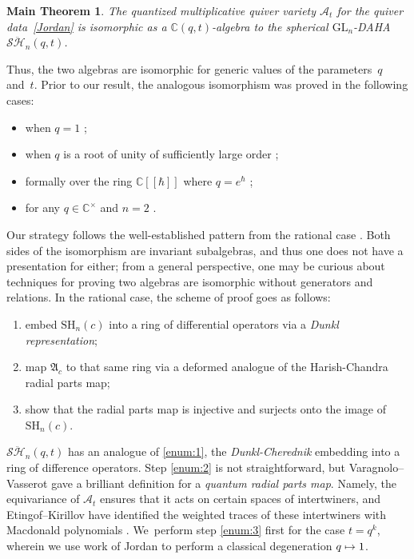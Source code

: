 \documentclass[JEP,XML,SOM,Unicode,published]{cedram}
\newcommand\mto{\mathchoice{\longmapsto}{\mapsto}{\mapsto}{\mapsto}}
\newcommand{\GL}{\mathrm{GL}}
\newcommand{\SH}{\mathrm{SH}}
\newtheorem*{main}{Main Theorem}
\theoremstyle{definition}
\newcommand{\CC}{\mathbb{C}}
\newcommand{\SHH}{\mathcal{S}\ddot{\mathcal{H}}}
\begin{document}
\begin{main}
The quantized multiplicative quiver variety $\mathcal{A}_t$ for the quiver data~\eqref{Jordan} is isomorphic as a $\CC(q,t)$-algebra to the spherical $\GL_n$-DAHA $\SHH_n(q,t)$.
\end{main}

Thus, the two algebras are isomorphic for generic values of the parameters~$q$ and~$t$.
Prior to our result, the analogous isomorphism was proved in the following cases:
\begin{itemize}
\item when $q=1$ \cite{ObDAHA};
\item when $q$ is a root of unity of sufficiently large order \cite{VarVassRoot};
\item formally over the ring $\CC[\![\hbar]\!]$ where $q=e^\hbar$ \cite{JordanMult};
\item for any $q\in\CC^\times$ and $n=2$ \cite{BalJor}.
\end{itemize}

Our strategy follows the well-established pattern from the rational case \cite{GanGinz, EGGO}.
Both sides of the isomorphism are invariant subalgebras, and thus one does not have a presentation for either; from a general perspective, one may be curious about techniques for proving two algebras are isomorphic without generators and relations.
In the rational case, the scheme of proof goes as follows:
\begin{enumerate}
\item\label{enum:1} embed $\SH_n(c)$ into a ring of differential operators via a \textit{Dunkl representation};
\item\label{enum:2} map $\mathfrak{A}_c$ to that same ring via a deformed analogue of the Harish-Chandra radial parts map;
\item\label{enum:3} show that the radial parts map is injective and surjects onto the image of $\SH_n(c)$.
\end{enumerate}
$\SHH_n(q,t)$ has an analogue of \eqref{enum:1}, the \textit{Dunkl-Cherednik} embedding into a ring of difference operators.
Step \eqref{enum:2} is not straightforward, but Varagnolo--Vasserot \cite{VarVassRoot} gave a brilliant definition for a \textit{quantum radial parts map}.
Namely, the equivariance of $\mathcal{A}_t$ ensures that it acts on certain spaces of intertwiners, and Etingof--Kirillov have identified the weighted traces of these intertwiners with Macdonald polynomials \cite{EtKirQuant}. We~perform step \eqref{enum:3} first for the case $t=q^k$, wherein we use work of Jordan \cite{JordanMult} to perform a classical degeneration $q\mto 1$.
\end{document}
